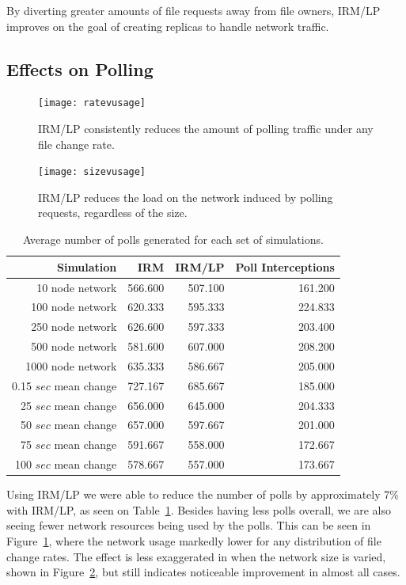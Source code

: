 \documentclass[10pt, conference, compsocconf, letterpaper]{IEEEtran} %
\begin{document}
By diverting greater amounts of file requests away from file owners, IRM/LP improves on the goal of creating replicas to handle network traffic.

\subsection{Effects on Polling}

\begin{figure}
\texttt{[image: ratevusage]}
\caption{IRM/LP consistently reduces the amount of polling traffic under any file change rate.}
\label{ratevusage}
\end{figure}



\begin{figure}
\texttt{[image: sizevusage]}
\caption{IRM/LP reduces the load on the network induced by polling requests, regardless of the size.}
\label{sizevusage}
\end{figure}

\begin{table}
    \centering
	\begin{tabular}{|r||r|r|r|} \hline 
		Simulation & IRM & IRM/LP & Poll Interceptions \\ \hline \hline
		  10 node network & 566.600& 507.100 &161.200\\ \hline
		 100 node network & 620.333& 595.333 &224.833\\ \hline
		 250 node network & 626.600& 597.333 &203.400\\ \hline
		 500 node network & 581.600& 607.000 &208.200\\ \hline
		1000 node network & 635.333& 586.667 &205.000\\ \hline \hline
		0.15 $sec$ mean change& 727.167& 685.667 &185.000 \\ \hline
		25 $sec$ mean change& 656.000& 645.000&204.333\\ \hline
		50 $sec$ mean change& 657.000& 597.667&201.000\\ \hline
		75 $sec$ mean change& 591.667& 558.000&172.667\\ \hline
		100 $sec$ mean change& 578.667& 557.000&173.667\\ \hline
	\end{tabular}
	\caption{Average number of polls generated for each set of simulations.}
	\label{polltable}
\end{table}


Using IRM/LP we were able to reduce the number of polls by approximately 7\% with IRM/LP, as seen on Table~\ref{polltable}. Besides having less polls overall, we are also seeing fewer network resources being used by the polls.  This can be seen in Figure~\ref{ratevusage}, where the network usage markedly lower for any distribution of file change rates.  The effect is less exaggerated in when the network size is varied, shown in Figure~\ref{sizevusage}, but still indicates noticeable improvement in  almost all cases.
\end{document}
